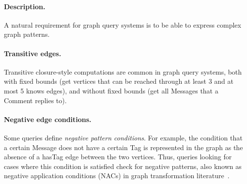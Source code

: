 
\paragraph{Description.}

A natural requirement for graph query systems is to be able to express complex
graph patterns.

\paragraph{Transitive edges.} Transitive closure-style computations are common
in graph query systems, both with fixed bounds (\eg get vertices that can be
reached through at least 3 and at most 5 \textsf{knows} edges), and without
fixed bounds (\eg get all \textsf{Messages} that a \textsf{Comment} replies to).

\paragraph{Negative edge conditions.} Some queries define \emph{negative pattern
conditions}. For example, the condition that a certain \textsf{Message} does not
have a certain \textsf{Tag} is represented in the graph as the absence of a
\textsf{hasTag} edge between the two vertices. Thus, queries looking for cases
where this condition is satisfied check for negative patterns, also known as
negative application conditions (NACs) in graph transformation
literature~\cite{DBLP:journals/fuin/HabelHT96}.


